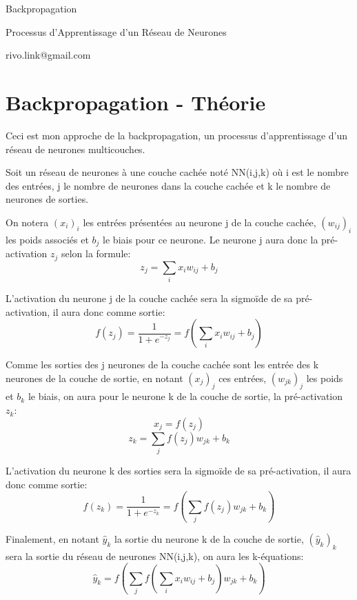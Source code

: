 \documentclass{article}
\begin{document}
\vspace*{\fill}
\begingroup
\centering
Backpropagation

Processus d'Apprentissage d'un Réseau de Neurones

rivo.link@gmail.com

\endgroup
\vspace*{\fill}

\newpage

\section{Backpropagation - Théorie}

\smallbreak
Ceci est mon approche de la backpropagation, un processus d'apprentissage d'un réseau de neurones multicouches.

\smallbreak
Soit un réseau de neurones à une couche cachée noté NN(i,j,k) où i est le nombre des entrées, j le nombre de neurones dans la couche cachée et k le nombre de neurones de sorties.

\smallbreak
On notera $(x_i)_i$ les entrées présentées au neurone j de la couche cachée, $(w_{ij})_i$ les poids associés et $b_j$ le biais pour ce neurone. Le neurone j aura donc la pré-activation $z_j$ selon la formule:
\begin{equation}
z_j=\sum_i{{x_i}{w_{ij}}}+b_j
\end{equation}

L'activation du neurone j de la couche cachée sera la sigmoïde de sa pré-activation, il aura donc comme sortie: 
\begin{equation}
f(z_j)=\frac{1}{1+e^{-z_j}}=f(\sum_i{{x_i}{w_{ij}}}+b_j)
\end{equation}

Comme les sorties des j neurones de la couche cachée sont les entrée des k neurones de la couche de sortie, en notant $(x_j)_j$ ces entrées, $(w_{jk})_j$ les poids et $b_k$ le biais, on aura pour le neurone k de la couche de sortie, la pré-activation $z_k$:
$$x_j=f(z_j)$$
\begin{equation}
z_k=\sum_j{f(z_j){w_{jk}}}+b_k
\end{equation}

L'activation du neurone k des sorties sera la sigmoïde de sa pré-activation, il aura donc comme sortie: 
\begin{equation}
f(z_k)=\frac{1}{1+e^{-z_k}}=f(\sum_j{f(z_j){w_{jk}}}+b_k)
\end{equation}

Finalement, en notant $\hat{y}_k$ la sortie du neurone k de la couche de sortie, $(\hat{y}_k)_k$ sera la sortie du réseau de neurones NN(i,j,k), on aura les k-équations:
\begin{equation}
\hat{y}_k=f(\sum_j{f(\sum_i{x_i{w_{ij}}}+b_j){w_{jk}}}+b_k)
\end{equation}
\end{document}
